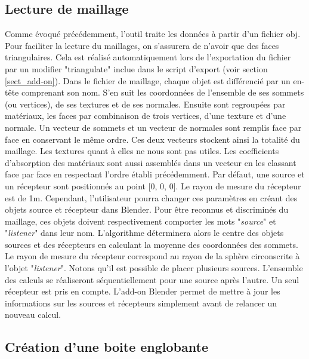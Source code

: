 \subsection{Lecture de maillage}
Comme évoqué précédemment, l'outil traite les données à partir d'un fichier \gls{obj}. Pour faciliter la lecture du maillages, on s'assurera de n'avoir que des faces triangulaires. Cela est réalisé automatiquement lors de l'exportation du fichier par un \gls{modifier} "triangulate" inclue dans le script d'export (voir section \ref{sect_add-on}). Dans le fichier de maillage, chaque objet est différencié par un en-tête comprenant son nom. S'en suit les coordonnées de l'ensemble de ses sommets (ou vertices), de ses textures et de ses normales. Ensuite sont regroupées par matériaux, les faces par combinaison de trois vertices, d'une texture et d'une normale. Un vecteur de sommets et un vecteur de normales sont remplis face par face en conservant le même ordre. Ces deux vecteurs stockent ainsi la totalité du maillage. Les textures quant à elles ne nous sont pas utiles. Les coefficients d'absorption des matériaux sont aussi assemblés dans un vecteur en les classant face par face en respectant l'ordre établi précédemment.
Par défaut, une source et un récepteur sont positionnés au point [0, 0, 0]. Le rayon de mesure du récepteur est de 1m. Cependant, l'utilisateur pourra changer ces paramètres en créant des objets source et récepteur dans Blender. Pour être reconnus et discriminés du maillage, ces objets doivent respectivement comporter les mots "\textit{source}" et "\textit{listener}" dans leur nom. L'algorithme déterminera alors le centre des objets sources et des récepteurs en calculant la moyenne des coordonnées des sommets. Le rayon de mesure du récepteur correspond au rayon de la sphère circonscrite à l'objet "\textit{listener}". Notons qu'il est possible de placer plusieurs sources. L'ensemble des calculs se réaliseront séquentiellement pour une source après l'autre. Un seul récepteur est pris en compte. L'add-on Blender permet de mettre à jour les informations sur les sources et récepteurs simplement avant de relancer un nouveau calcul.



\subsection{Création d'une boite englobante}

